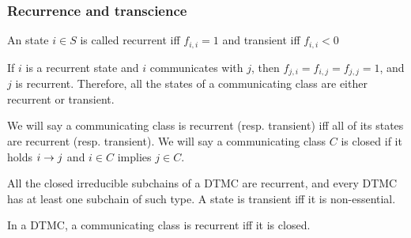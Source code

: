  \begin{frame} \frametitle{Recurrence and transcience}
    \begin{definition}
    An state \(i\in S\) is called recurrent iff \(f_{i,i} = 1\) and transient iff \(f_{i,i} < 0\)
    \end{definition}

    \begin{proposition}
    If \(i\) is a recurrent state and \(i\) communicates with \(j\), then 
    \(f_{j,i} = f_{i,j} = f_{j,j} = 1\), and \(j\) is recurrent. Therefore, all the states of a
    communicating class are either recurrent or transient.
    \end{proposition}
    
    \begin{definition}
    We will say a communicating class is recurrent (resp. transient) iff all of its states
    are recurrent (resp. transient). We will say a communicating class \(C\) is closed if it
    holds \(i \rightarrow j\) and \(i\in C\) implies \(j\in C\).
    \end{definition}
    
    \begin{proposition}
    All the closed irreducible subchains of a DTMC are recurrent, and every DTMC has
    at least one subchain of such type. A state is transient iff it is non-essential.
    \end{proposition}
  
    \begin{corollary}
    In a DTMC, a communicating class is recurrent iff it is closed.
    \end{corollary}
    
 \end{frame}
 
